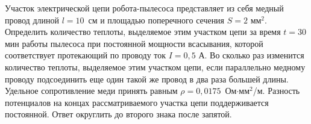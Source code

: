 
Участок электрической цепи робота-пылесоса представляет из себя медный провод длиной $l=10$~см и  площадью 
поперечного сечения $S=2$ мм$^2$. Определить количество теплоты, выделяемое этим участком цепи за время $t=30$ мин 
работы пылесоса при постоянной мощности всасывания, которой соответствует протекающий по проводу ток $I=0,5$ А.  
Во сколько раз  изменится количество теплоты, выделяемое этим участком цепи, если параллельно медному проводу  
подсоединить еще один такой же провод в два раза большей длины. Удельное сопротивление меди принять равным $\rho=0,0175$~Ом$\cdot$мм$^2$/м. 
Разность потенциалов на концах рассматриваемого участка цепи поддерживается постоянной. Ответ округлить до 
второго знака после запятой.